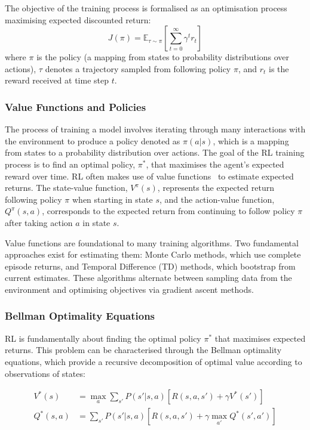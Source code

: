 The objective of the training process is formalised as an optimisation process maximising expected discounted return:
\[
J(\pi) = \mathbb{E}_{\tau \sim \pi}\left[\sum_{t=0}^{\infty} \gamma^t r_t\right]
\]
where $\pi$ is the policy (a mapping from states to probability distributions over actions), $\tau$ denotes a trajectory sampled from following policy $\pi$, and $r_t$ is the reward received at time step $t$.


\subsubsection{Value Functions and Policies}\label{subsec:value_policy}

The process of training a model involves iterating through many interactions with the environment to produce a policy denoted as \(\pi(a|s)\), which is a mapping from states to a probability distribution over actions. The goal of the RL training process is to find an optimal policy, \(\pi^*\), that maximises the agent's expected reward over time. RL often makes use of value functions~\citep{sutton2018reinforcement} to estimate expected returns. The state-value function, \(V^\pi(s)\), represents the expected return following policy \(\pi\) when starting in state \(s\), and the action-value function, \(Q^\pi(s,a)\), corresponds to the expected return from continuing to follow policy \(\pi\) after taking action \(a\) in state \(s\).

Value functions are foundational to many training algorithms. Two fundamental approaches exist for estimating them: Monte Carlo methods, which use complete episode returns, and Temporal Difference (TD) methods, which bootstrap from current estimates. These algorithms alternate between sampling data from the environment and optimising objectives via gradient ascent methods. 

\subsubsection{Bellman Optimality Equations}\label{subsubsec:bellman_optimality}

RL is fundamentally about finding the optimal policy $\pi^*$ that maximises expected returns. This problem can be characterised through the Bellman optimality equations, which provide a recursive decomposition of optimal value according to observations of states:

\begin{align}
    V^*(s) &= \max_a \sum_{s'} P(s'|s,a)[R(s,a,s') + \gamma V^*(s')] \\
    Q^*(s,a) &= \sum_{s'} P(s'|s,a)[R(s,a,s') + \gamma \max_{a'} Q^*(s',a')]
\end{align}

